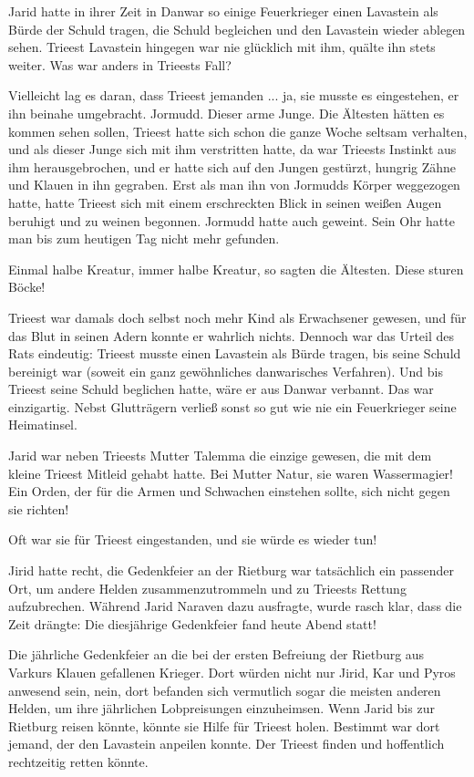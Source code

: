 Jarid hatte in ihrer Zeit in Danwar so einige Feuerkrieger einen Lavastein als Bürde der Schuld tragen, die Schuld begleichen und den Lavastein wieder ablegen sehen. Trieest Lavastein hingegen war nie glücklich mit ihm, quälte ihn stets weiter. Was war anders in Trieests Fall?

Vielleicht lag es daran, dass Trieest jemanden ... ja, sie musste es eingestehen, er ihn beinahe umgebracht. Jormudd. Dieser arme Junge. Die Ältesten hätten es kommen sehen sollen, Trieest hatte sich schon die ganze Woche seltsam verhalten, und als dieser Junge sich mit ihm verstritten hatte, da war Trieests Instinkt aus ihm herausgebrochen, und er hatte sich auf den Jungen gestürzt, hungrig Zähne und Klauen in ihn gegraben. Erst als man ihn von Jormudds Körper weggezogen hatte, hatte Trieest sich mit einem erschreckten Blick in seinen weißen Augen beruhigt und zu weinen begonnen. Jormudd hatte auch geweint. Sein Ohr hatte man bis zum heutigen Tag nicht mehr gefunden.

Einmal halbe Kreatur, immer halbe Kreatur, so sagten die Ältesten. Diese sturen Böcke!

Trieest war damals doch selbst noch mehr Kind als Erwachsener gewesen, und für das Blut in seinen Adern konnte er wahrlich nichts. Dennoch war das Urteil des Rats eindeutig: Trieest musste einen Lavastein als Bürde tragen, bis seine Schuld bereinigt war (soweit ein ganz gewöhnliches danwarisches Verfahren). Und bis Trieest seine Schuld beglichen hatte, wäre er aus Danwar verbannt. Das war einzigartig. Nebst Glutträgern verließ sonst so gut wie nie ein Feuerkrieger seine Heimatinsel.

Jarid war neben Trieests Mutter Talemma die einzige gewesen, die mit dem kleine Trieest Mitleid gehabt hatte. Bei Mutter Natur, sie waren Wassermagier! Ein Orden, der für die Armen und Schwachen einstehen sollte, sich nicht gegen sie richten!

Oft war sie für Trieest eingestanden, und sie würde es wieder tun!

Jirid hatte recht, die Gedenkfeier an der Rietburg war tatsächlich ein passender Ort, um andere Helden zusammenzutrommeln und zu Trieests Rettung aufzubrechen. Während Jarid Naraven dazu ausfragte, wurde rasch klar, dass die Zeit drängte: Die diesjährige Gedenkfeier fand heute Abend statt!

Die jährliche Gedenkfeier an die bei der ersten Befreiung der Rietburg aus Varkurs Klauen gefallenen Krieger. Dort würden nicht nur Jirid, Kar und Pyros anwesend sein, nein, dort befanden sich vermutlich sogar die meisten anderen Helden, um ihre jährlichen Lobpreisungen einzuheimsen. Wenn Jarid bis zur Rietburg reisen könnte, könnte sie Hilfe für Trieest holen. Bestimmt war dort jemand, der den Lavastein anpeilen konnte. Der Trieest finden und hoffentlich rechtzeitig retten könnte.

